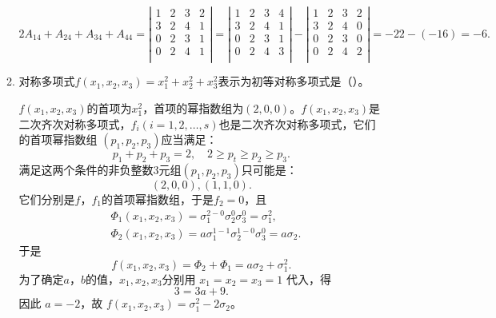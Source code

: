 \begin{enumerate}[1~]
\begin{enumerate}[1.~]
\begin{solution}
$$2A_{14} + A_{24} + A_{34} + A_{44} = \left| \begin{matrix}
	1&		2&		3&		2\\
	3&		2&		4&		1\\
	0&		2&		3&		1\\
	0&		2&		4&		1\\
\end{matrix} \right|=\left| \begin{matrix}
	1&		2&		3&		4\\
	3&		2&		4&		1\\
	0&		2&		3&		1\\
	0&		2&		4&		3\\
\end{matrix} \right|-\left| \begin{matrix}
	1&		2&		3&		2\\
	3&		2&		4&		0\\
	0&		2&		3&		0\\
	0&		2&		4&		2\\
\end{matrix} \right|=-22-(-16)=-6.$$
\end{solution}

\item
 对称多项式$f \left( x _ { 1 } , x _ { 2 } , x _ { 3 } \right) = x _ { 1 } ^ { 2 } + x _ { 2 } ^ { 2 } + x _ { 3 } ^ { 2 }$表示为初等对称多项式是（\quad）。
 \begin{solution}
$f \left( x _ { 1 } , x _ { 2 } , x _ { 3 } \right)$的首项为$x_1^2$，首项的幂指数组为$(2, 0, 0)$。$f \left( x _ { 1 } , x _ { 2 } , x _ { 3 } \right)$是二次齐次对称多项式，$f_i (i=1, 2, \dots, s)$也是二次齐次对称多项式，它们的首项幂指数组
$(p_1, p_2, p_3)$应当满足：\[
p _ { 1 } + p _ { 2 } + p _ { 3 } = 2 , \quad 2 \geqslant p _ { t } \geqslant p _ { 2 } \geqslant p _ { 3 }.
\]
满足这两个条件的非负整数3元组$(p_1, p_2, p_3)$只可能是：\[
( 2, 0, 0 ) , (1,1,0) .
\]
它们分别是$f$，$f_1$的首项幂指数组，于是$f_2=0$，且
\begin{align*}
& \Phi _ { 1 } \left( x _ { 1 }, x_2 , x _ { 3 } \right) = \sigma _ { 1 } ^ { 2 - 0 } \sigma _ { 2 } ^ { 0 } \sigma _ { 3 } ^ { 0 }  = \sigma _ { 1 } ^ { 2 },  \\ 
&{ \Phi _ { 2 } \left( x _ { 1 }, x_2 , x _ { 3 } \right) = a \sigma _ { 1 } ^ { 1 - 1 } \sigma _ { 2 } ^ { 1 - 0 } \sigma _ { 3 } ^ { 0 } = a \sigma _ { 2 } }.
\end{align*}
于是\[
f(x_1, x_2, x_3)=\Phi_2+\Phi_1=a\sigma_2+\sigma_1^2.
\]
为了确定$a$，$b$的值，$x_1, x_2, x_3$分别用 $x_1=x_2=x_3=1$ 代入，得\[
3=3a+9.
\]
因此 $a=-2$，故 $f(x_1, x_2, x_3)=\sigma_1^2-2\sigma_2$。
 \end{solution}
 

\end{enumerate}
\end{enumerate}

